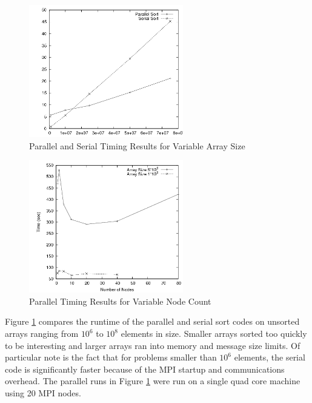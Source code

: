 \documentclass{article}
\begin{document}
\begin{figure}
\centering
\includegraphics[width=0.6\textwidth]{img/comparison1.png}
\caption{Parallel and Serial Timing Results for Variable Array Size}
\label{chart1}
\end{figure}

\begin{figure}
\centering
\includegraphics[width=0.6\textwidth]{img/comparison2.png}
\caption{Parallel Timing Results for Variable Node Count}
\label{chart2}
\end{figure}

Figure \ref{chart1} compares the runtime of the parallel and serial sort codes on unsorted arrays ranging from \(10^6\) to \(10^8\) elements in size. Smaller arrays sorted too quickly to be interesting and larger arrays ran into memory and message size limits. Of particular note is the fact that for problems smaller than \(10^6\) elements, the serial code is significantly faster because of the MPI startup and communications overhead. The parallel runs in Figure \ref{chart1} were run on a single quad core machine using 20 MPI nodes.
\end{document}
